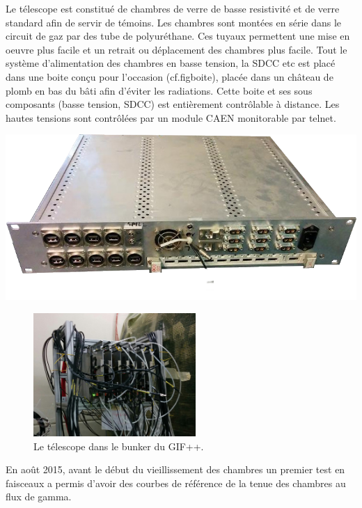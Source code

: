 Le télescope est constitué de chambres de verre de basse resistivité et de verre standard afin de servir de témoins. Les chambres sont montées en série dans le circuit de gaz par des tube de polyuréthane. Ces tuyaux permettent une mise en oeuvre plus facile et un retrait ou déplacement des chambres plus facile. Tout le système d'alimentation des chambres en basse tension, la SDCC etc est placé dans une boite conçu pour l'occasion (cf.fig{boite}), placée dans un château de plomb en bas du bâti afin d'éviter les radiations. Cette boite et ses sous composants (basse tension, SDCC) est entièrement contrôlable à distance. Les hautes tensions sont contrôlées par un module CAEN monitorable par telnet.

\marginpar
{
	\centering
	\includegraphics[width=1.0\marginparwidth]{GLA/boite.png}
	\label{boite}
}

\begin{figure}[!ht]
	\centering
	\includegraphics[width=0.55\textwidth]{GLA/GIFppChambers.png}
	\caption{Le télescope dans le bunker du GIF++.}
	\label{GIFppChambers}
\end{figure}

En août 2015, avant le début du vieillissement des chambres un premier test en faisceaux a permis d'avoir des courbes de référence de la tenue des chambres au flux de gamma.

